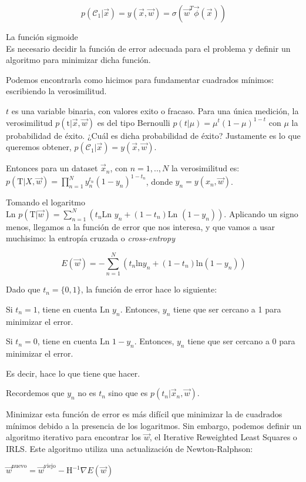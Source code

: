 \documentclass[twoside,11pt]{article}
\begin{document}
$$p(\mathcal{C}_{1}|\vec{x})=y(\vec{x},\vec{w})=\sigma(\vec{w}^{T}\vec{\phi}(\vec{x}))$$

La función sigmoide\\
Es necesario decidir la función de error adecuada para el problema y definir un algoritmo para minimizar dicha función.

Podemos encontrarla como hicimos para fundamentar cuadrados mínimos: escribiendo la verosimilitud.

$t$ es una variable binaria, con valores exito o fracaso. 
Para una única medición, la verosimilitud $p(\text{t}|\vec{x},\vec{w})$ es del tipo Bernoulli $p(t|\mu)=\mu^{t}(1-\mu)^{1-t}$ con $\mu$ la probabilidad de éxito. 
¿Cuál es dicha probabilidad de éxito? Justamente es lo que queremos obtener, $p(\mathcal{C}_{1}|\vec{x})=y(\vec{x},\vec{w})$.

Entonces para un dataset $\vec{x}_{n}$, con $n=1,..,N$ la verosimilitud es:\\
$p(\text{T}|X,\vec{w})=\prod_{n=1}^{N}y^{t_n}_{n}(1-y_{n})^{1-t_n}$, donde $y_{n}=y(x_{n},\vec{w})$. 

Tomando el logaritmo 
$\text{Ln }p(\text{T}|\vec{w})=\sum_{n=1}^{N}(t_{n}\text{Ln }y_{n}+(1-t_{n})\text{Ln }(1-y_{n}))$. 
Aplicando un signo menos, llegamos a la función de error que nos interesa, y que vamos a usar muchisimo: 
la entropía cruzada o \textit{cross-entropy}

$$E(\vec{w})=-\sum_{n=1}^{N}(t_{n}\text{ln}y_{n}+(1-t_{n})\text{ln}(1-y_{n}))$$

Dado que $t_{n}=\{0,1\}$, la función de error hace lo siguiente:

Si $t_{n}=1$, tiene en cuenta $\text{Ln }y_{n}$.
Entonces, $y_{n}$ tiene que ser cercano a 1 para minimizar el error.

Si $t_{n}=0$, tiene en cuenta $\text{Ln }1-y_{n}$. 
Entonces, $y_{n}$ tiene que ser cercano a 0 para minimizar el error.

Es decir, hace lo que tiene que hacer. 

Recordemos que $y_{n}$ no es $t_{n}$ sino que es $p(t_{n}|\vec{x}_{n},\vec{w})$.

Minimizar esta función de error es más difícil que minimizar la de cuadrados mínimos debido a la presencia de los logaritmos. 
Sin embargo, podemos definir un algoritmo iterativo para encontrar los $\vec{w}$, el Iterative Reweighted Least Squares o IRLS. 
Este algoritmo utiliza una actualización de Newton-Ralphson:

$\vec{w}^{\text{nuevo}}=\vec{w}^{\text{viejo}}-\text{H}^{-1}\nabla E(\vec{w})$
\end{document}

